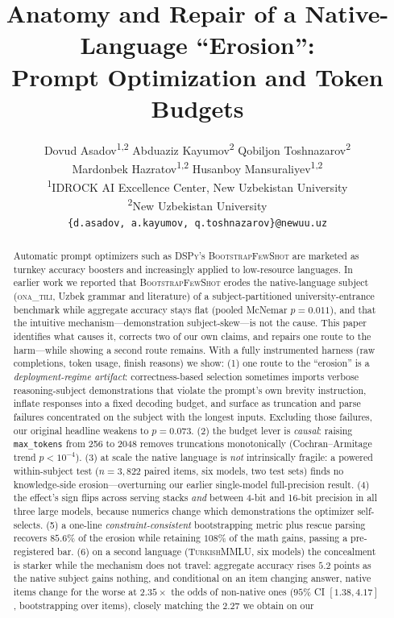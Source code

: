 \documentclass[11pt]{article}
\title{Anatomy and Repair of a Native-Language ``Erosion'':\\
Prompt Optimization and Token Budgets}
\author{
  Dovud Asadov\textsuperscript{1,2} \quad
  Abduaziz Kayumov\textsuperscript{2} \quad
  Qobiljon Toshnazarov\textsuperscript{2} \\
  Mardonbek Hazratov\textsuperscript{1,2} \quad
  Husanboy Mansuraliyev\textsuperscript{1,2} \\[2pt]
  \textsuperscript{1}IDROCK AI Excellence Center, New Uzbekistan University \\
  \textsuperscript{2}New Uzbekistan University \\
  \texttt{\{d.asadov,\,a.kayumov,\,q.toshnazarov\}@newuu.uz}
}
\newcommand{\ona}{\textsc{ona\_tili}}
\newcommand{\bsfs}{\textsc{BootstrapFewShot}}
\begin{document}
\maketitle

\begin{abstract}
Automatic prompt optimizers such as \textsc{DSPy}'s \bsfs{} are marketed as turnkey
accuracy boosters and increasingly applied to low-resource languages. In earlier work
we reported that \bsfs{} erodes the native-language subject (\ona{}, Uzbek grammar and
literature) of a subject-partitioned university-entrance benchmark while aggregate
accuracy stays flat (pooled McNemar $p{=}0.011$), and that the intuitive
mechanism---demonstration subject-skew---is not the cause. This paper identifies what
causes it, corrects two of our own claims, and repairs one route to the harm---while
showing a second route remains. With a fully instrumented harness (raw completions,
token usage, finish reasons) we show:
(1) one route to the ``erosion'' is a \emph{deployment-regime artifact}: correctness-based selection
sometimes imports verbose reasoning-subject demonstrations that violate the prompt's
own brevity instruction, inflate responses into a fixed decoding budget, and surface as
truncation and parse failures concentrated on the subject with the longest inputs.
Excluding those failures, our original headline weakens to $p{=}0.073$.
(2) the budget lever is \emph{causal}: raising \texttt{max\_tokens} from 256 to 2048
removes truncations monotonically (Cochran--Armitage trend $p{<}10^{-4}$).
(3) at scale the native language is \emph{not} intrinsically fragile: a powered
within-subject test ($n{=}3{,}822$ paired items, six models, two test sets) finds no
knowledge-side erosion---overturning our earlier single-model full-precision result.
(4) the effect's sign flips across serving stacks \emph{and} between 4-bit and
16-bit precision in all three large models, because numerics change which demonstrations the optimizer
self-selects.
(5) a one-line \emph{constraint-consistent} bootstrapping metric plus rescue parsing
recovers $85.6\%$ of the erosion while retaining $108\%$ of the math gains, passing a
pre-registered bar.
(6) on a second language (\textsc{TurkishMMLU}, six models) the concealment is starker
while the mechanism does not travel: aggregate accuracy rises $5.2$ points as the
native subject gains nothing, and conditional on an item changing answer, native items
change for the worse at $2.35\times$ the odds of non-native ones ($95\%$ CI
$[1.38, 4.17]$, bootstrapping over items), closely matching the $2.27$ we obtain on our

\end{abstract}
\end{document}
